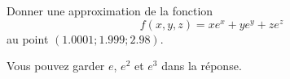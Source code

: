 
\begin{exercice}\label{exoOutilsMath-0056}

    Donner une approximation de la fonction
    \begin{equation}
        f(x,y,z)=xe^x+ye^y+ze^z
    \end{equation}
    au point $(1.0001;1.999;2.98)$.

    Vous pouvez garder \( e\), \( e^2\) et \( e^3\) dans la réponse.

\end{exercice}
